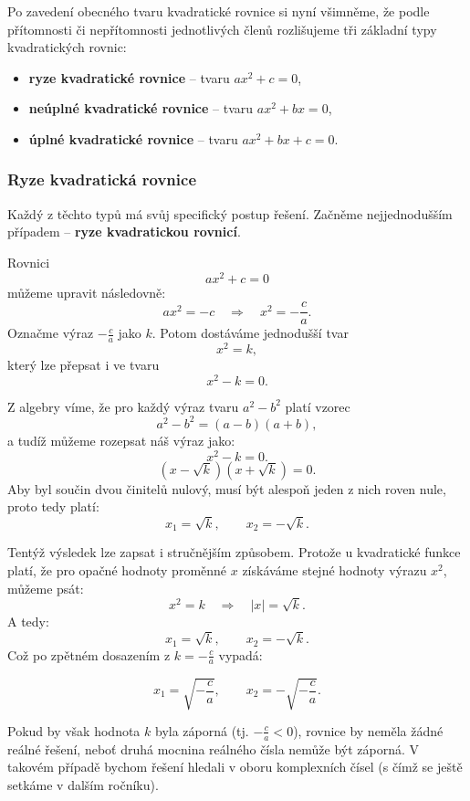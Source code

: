 \documentclass[12pt,a4paper]{article}
\begin{document}
Po zavedení obecného tvaru kvadratické rovnice si nyní všimněme, 
že podle přítomnosti či nepřítomnosti jednotlivých členů 
rozlišujeme tři základní typy kvadratických rovnic:

\begin{itemize}
  \item \textbf{ryze kvadratické rovnice} – tvaru \(ax^2 + c = 0\),
  \item \textbf{neúplné kvadratické rovnice} – tvaru \(ax^2 + bx = 0\),
  \item \textbf{úplné kvadratické rovnice} – tvaru \(ax^2 + bx + c = 0\).
\end{itemize}


\subsubsection*{Ryze kvadratická rovnice}
Každý z těchto typů má svůj specifický postup řešení. 
Začněme nejjednodušším případem – \textbf{ryze kvadratickou rovnicí}.



Rovnici
\[
ax^2 + c = 0
\]
můžeme upravit následovně:
\[
ax^2 = -c \quad \Rightarrow \quad x^2 = -\frac{c}{a}.
\]
Označme výraz \(-\tfrac{c}{a}\) jako \(k\). Potom dostáváme jednodušší tvar
\[
x^2 = k,
\]
který lze přepsat i ve tvaru
\[
x^2 - k = 0.
\]

Z algebry víme, že pro každý výraz tvaru \(a^2 - b^2\) platí vzorec
\[
a^2 - b^2 = (a - b)(a + b),
\]
a tudíž můžeme rozepsat náš výraz jako:
\[
x^2 - k = 0.
\]
\[
(x - \sqrt{k})(x + \sqrt{k}) = 0.
\]
Aby byl součin dvou činitelů nulový, musí být alespoň jeden z nich roven nule, 
proto tedy platí:
\[
x_1 = \sqrt{k}, \qquad x_2 = -\sqrt{k}.
\]



Tentýž výsledek lze zapsat i stručnějším způsobem.  
Protože u kvadratické funkce platí, že pro opačné hodnoty proměnné \(x\) 
získáváme stejné hodnoty výrazu \(x^2\), 
můžeme psát:
\[
x^2 = k \quad \Rightarrow \quad |x| = \sqrt{k}.
\]
A tedy:
\[
x_1 = \sqrt{k}, \qquad x_2 = -\sqrt{k}.
\]
Což po zpětném dosazením z $k=-\frac{c}{a}$ vypadá:

\[
x_1 = \sqrt{-\frac{c}{a}}, \qquad x_2 = -\sqrt{-\frac{c}{a}}.
\]



Pokud by však hodnota \(k\) byla záporná (tj. \(-\tfrac{c}{a} < 0\)), 
rovnice by neměla žádné reálné řešení, 
neboť druhá mocnina reálného čísla nemůže být záporná. 
V takovém případě bychom řešení hledali v oboru komplexních čísel (s čímž se ještě setkáme v dalším ročníku).
\end{document}
